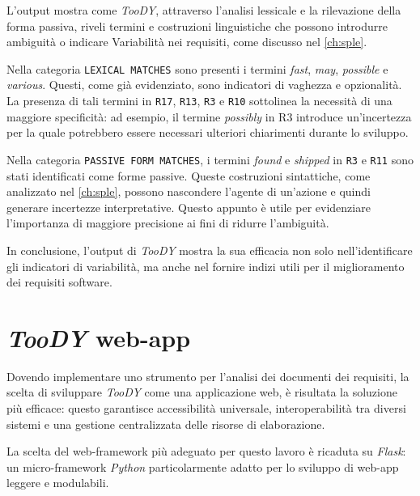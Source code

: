 \documentclass[12pt]{report}
\newcommand{\toody}{\textsl{TooDY}\xspace}
\newcommand{\python}{\textsl{Python}\xspace}
\newcommand{\flask}{\textsl{Flask}\xspace}
\begin{document}
L'output mostra come \toody, attraverso l'analisi lessicale e la rilevazione della forma passiva, riveli termini e costruzioni linguistiche che possono introdurre ambiguità o indicare Variabilità nei requisiti, come discusso nel \cref{ch:sple}.

Nella categoria \texttt{LEXICAL MATCHES} sono presenti i termini \textit{fast}, \textit{may}, \textit{possible} e \textit{various}. Questi, come già evidenziato, sono indicatori di vaghezza e opzionalità. La presenza di tali termini in \texttt{R17}, \texttt{R13}, \texttt{R3} e \texttt{R10} sottolinea la necessità di una maggiore specificità: ad esempio, il termine \textit{possibly} in R3 introduce un'incertezza per la quale potrebbero essere necessari ulteriori chiarimenti durante lo sviluppo.

Nella categoria \texttt{PASSIVE FORM MATCHES}, i termini \textit{found} e \textit{shipped} in \texttt{R3} e \texttt{R11} sono stati identificati come forme passive. Queste costruzioni sintattiche, come analizzato nel \cref{ch:sple}, possono nascondere l'agente di un'azione e quindi generare incertezze interpretative. Questo appunto è utile per evidenziare l'importanza di maggiore precisione ai fini di ridurre l'ambiguità.

In conclusione, l'output di \toody mostra la sua efficacia non solo nell'identificare gli indicatori di variabilità, ma anche nel fornire indizi utili per il miglioramento dei requisiti software.






\chapter{\toody web-app}
\label{ch:architettura}
Dovendo implementare uno strumento per l'analisi dei documenti dei requisiti, la scelta di sviluppare \toody come una applicazione web, è risultata la soluzione più efficace: questo garantisce accessibilità universale, interoperabilità tra diversi sistemi e una gestione centralizzata delle risorse di elaborazione.

La scelta del web-framework più adeguato per questo lavoro è ricaduta su \flask: un micro-framework \python particolarmente adatto per lo sviluppo di web-app leggere e modulabili.
\end{document}
